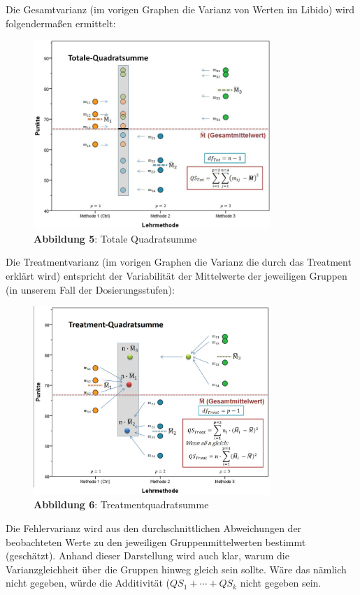 \documentclass[]{article}
\begin{document}
Die Gesamtvarianz (im vorigen Graphen die Varianz von Werten im Libido)
wird folgendermaßen ermittelt:

\begin{figure}
\centering
\includegraphics[width=0.80000\textwidth]{Images/ANOVA_QS_Total_Graphisch.jpg}
\caption{\textbf{Abbildung 5}: Totale Quadratsumme}
\end{figure}

Die Treatmentvarianz (im vorigen Graphen die Varianz die durch das
Treatment erklärt wird) entspricht der Variabilität der Mittelwerte der
jeweiligen Gruppen (in unserem Fall der Dosierungsstufen):

\begin{figure}
\centering
\includegraphics[width=0.80000\textwidth]{Images/ANOVA_QS_Treatment_Graphisch.jpg}
\caption{\textbf{Abbildung 6}: Treatmentquadratsumme}
\end{figure}

Die Fehlervarianz wird aus den durchschnittlichen Abweichungen der
beobachteten Werte zu den jeweiligen Gruppenmittelwerten bestimmt
(geschätzt). Anhand dieser Darstellung wird auch klar, warum die
Varianzgleichheit über die Gruppen hinweg gleich sein sollte. Wäre das
nämlich nicht gegeben, würde die Additivität (\(QS_1 + \cdots + QS_k\)
nicht gegeben sein.
\end{document}

